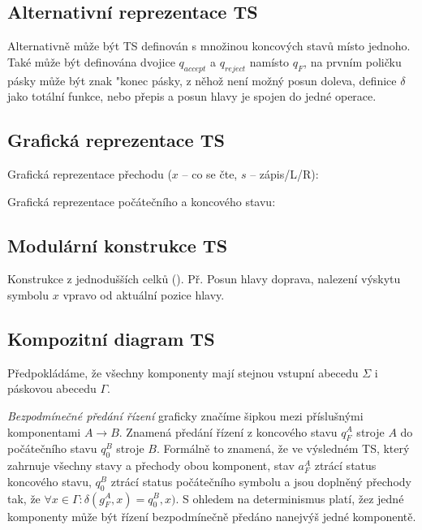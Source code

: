 \documentclass[a4paper, 11pt]{report}
\begin{document}
\subsection{Alternativní reprezentace TS}
Alternativně může být TS definován s množinou koncových stavů místo jednoho. Také může být definována dvojice $q_{accept}$ a $q_{reject}$ namísto $q_F$, na prvním poličku pásky může být znak "konec pásky, z něhož není možný posun doleva, definice $\delta$ jako totální funkce, nebo přepis a posun hlavy je spojen do jedné operace.

\subsection{Grafická reprezentace TS}

Grafická reprezentace přechodu ($x$ -- co se čte, $s$ -- zápis/L/R):

Grafická reprezentace počátečního a koncového stavu:

\subsection{Modulární konstrukce TS}
Konstrukce z jednodušších celků (). Př. Posun hlavy doprava, nalezení výskytu symbolu $x$ vpravo od aktuální pozice hlavy.

\subsection{Kompozitní diagram TS}
Předpokládáme, že všechny komponenty mají stejnou vstupní abecedu $\Sigma$ i páskovou abecedu $\Gamma$.

\emph{Bezpodmínečné předání řízení} graficky značíme šipkou mezi příslušnými komponentami $A \to B$. Znamená předání řízení z koncového stavu $q_F^A$ stroje $A$ do počátečního stavu $q_0^B$ stroje $B$.
Formálně to znamená, že ve výsledném TS, který zahrnuje všechny stavy a přechody obou komponent, stav $a_F^A$ ztrácí status koncového stavu, $q_0^B$ ztrácí status počátečního symbolu a jsou doplněný přechody tak, že $\forall x \in \Gamma: \delta(g_F^A, x) = q_0^B, x)$. S ohledem na determinismus platí, žez jedné komponenty může být řízení bezpodmínečně předáno nanejvýš jedné komponentě.
\end{document}
